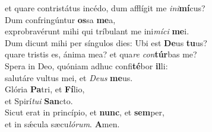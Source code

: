 \oddverse et quare contristátus incédo, dum afflígit me \textit{i}\textit{ni}\textbf{mí}cus?\\
\evenverse Dum confringúntur \textbf{os}sa \textbf{me}a,~\*\\
\evenverse exprobravérunt mihi qui tríbulant me ini\textit{mí}\textit{ci} \textbf{me}i.\\
\oddverse Dum dicunt mihi per síngulos dies: Ubi est \textbf{De}us \textbf{tu}us?~\*\\
\oddverse quare tristis es, ánima mea? et qua\textit{re} \textit{con}\textbf{túr}bas me?\\
\evenverse Spera in Deo, quóniam adhuc confi\textbf{té}bor \textbf{il}li:~\*\\
\evenverse salutáre vultus mei, et \textit{De}\textit{us} \textbf{me}us.\\
\oddverse Glória \textbf{Pa}tri, et \textbf{Fí}lio,~\*\\
\oddverse et Spirí\textit{tu}\textit{i} \textbf{San}cto.\\
\evenverse Sicut erat in princípio, et \textbf{nunc}, et \textbf{sem}per,~\*\\
\evenverse et in sǽcula sæcu\textit{ló}\textit{rum}. \textbf{A}men.\\
